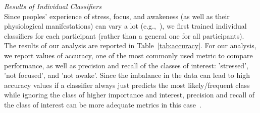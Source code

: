\noindent\textit{Results of Individual Classifiers}\\
Since peoples' experience of stress, focus, and awakeness (as well as their physiological manifestations) can vary a lot (e.g.,~\cite{Hernandez11}), we first trained individual classifiers for each participant (rather than a general one for all participants). The results of our analysis are reported in Table~\ref{tab:accuracy}. For our analysis, we report values of accuracy, one of the most commonly used metric to compare performance, as well as precision and recall of the classes of interest: 'stressed', 'not focused', and 'not awake'. Since the imbalance in the data can lead to high accuracy values if a classifier always just predicts the most likely/frequent class while ignoring the class of higher importance and interest, precision and recall of the class of interest can be more adequate metrics in this case~\cite{yap2014,bhattacharyya_data_2011,Hernandez11}. 



